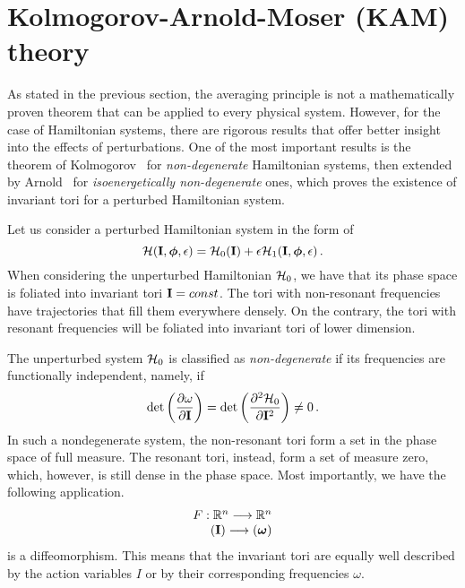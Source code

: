 \section{Kolmogorov-Arnold-Moser (KAM) theory}\label{sec:1:kam}

As stated in the previous section, the averaging principle is not a mathematically proven theorem that can be applied to every physical system. However, for the case of Hamiltonian systems, there are rigorous results that offer better insight into the effects of perturbations. One of the most important results is the theorem of Kolmogorov~\cite{KAM1} for \textit{non-degenerate} Hamiltonian systems, then extended by Arnold~\cite{KAM3} for \textit{isoenergetically non-degenerate} ones, which proves the existence of invariant tori for a perturbed Hamiltonian system.

Let us consider a perturbed Hamiltonian system in the form of
\begin{equation}
    \mathcal{H}(\vb{I}, \boldsymbol{\phi}, \epsilon) = \mathcal{H}_0(\vb{I}) + \epsilon\mathcal{H}_1(\vb{I},\boldsymbol{\phi},\epsilon)\,.
    \label{eq:1:hamperturbed}
\end{equation}
When considering the unperturbed Hamiltonian $\mathcal{H}_0$, we have that its phase space is foliated into invariant tori $\vb{I}=const$. The tori with non-resonant frequencies have trajectories that fill them everywhere densely. On the contrary, the tori with resonant frequencies will be foliated into invariant tori of lower dimension.

The unperturbed system $\mathcal{H}_0$ is classified as \textit{non-degenerate} if its frequencies are functionally independent, namely, if
\begin{equation}
    \det\left(\pdv{\omega}{\vb{I}}\right) = \det\left(\pdv[2]{\mathcal{H}_0}{\vb{I}}\right) \neq 0 \,.
\end{equation}
In such a nondegenerate system, the non-resonant tori form a set in the phase space of full measure. The resonant tori, instead, form a set of measure zero, which, however, is still dense in the phase space. Most importantly, we have the following application.
\begin{equation}
    \begin{array}{r}
    F: \mathbb{R}^{n} \longrightarrow \mathbb{R}^n \\
    (\vb{I}) \longrightarrow(\boldsymbol{\omega})
    \end{array}
\end{equation}
is a diffeomorphism. This means that the invariant tori are equally well described by the action variables $I$ or by their corresponding frequencies $\omega$.

